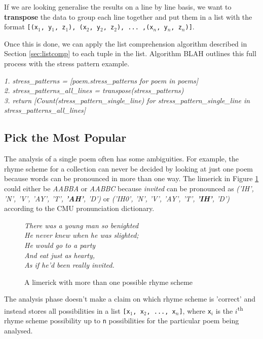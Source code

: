If we are looking generalise the results on a line by line basis, we want to \textbf{transpose} the data to group each line together and put them in a list with the format \texttt{[(x$_1$, y$_1$, z$_1$), (x$_2$, y$_2$, z$_2$), ... ,(x$_n$, y$_n$, z$_n$)]}.

Once this is done, we can apply the list comprehension algorithm described in Section \ref{sec:listcomp} to each tuple in the list. Algorithm BLAH outlines this full process with the stress pattern example.

\textit{
1. stress\_patterns = [poem.stress\_patterns for poem in poems]\\
2. stress\_patterns\_all\_lines = transpose(stress\_patterns)\\
3. return [Count(stress\_pattern\_single\_line) for stress\_pattern\_single\_line in stress\_patterns\_all\_lines]\\
}
\subsection{Pick the Most Popular}

The analysis of a single poem often has some ambiguities. For example, the rhyme scheme for a collection can never be decided by looking at just one poem because words can be pronounced in more than one way. The limerick in Figure \ref{fig:ambiguous-rhyme} could either be \textit{AABBA} or \textit{AABBC} because \textit{invited} can be pronounced as \textit{('IH', 'N', 'V', 'AY', 'T', \textbf{'AH'}, 'D')} or \textit{('IH0', 'N', 'V', 'AY', 'T', \textbf{'IH'}, 'D')} according to the CMU pronunciation dictionary.

\begin{figure}[h!]
\centering
\textit{
There was a young man so benighted\\
He never knew when he was slighted;\\
He would go to a party\\
And eat just as hearty,\\
As if he'd been really invited.\\
}
\caption{A limerick with more than one possible rhyme scheme}
\label{fig:ambiguous-rhyme}
\end{figure}

The analysis phase doesn't make a claim on which rhyme scheme is 'correct' and instead stores all possibilities in a list \texttt{[x$_1$, x$_2$, ..., x$_n$]}, where \texttt{x$_i$} is the $i$\textsuperscript{th} rhyme scheme possibility up to \texttt{n} possibilities for the particular poem being analysed.

